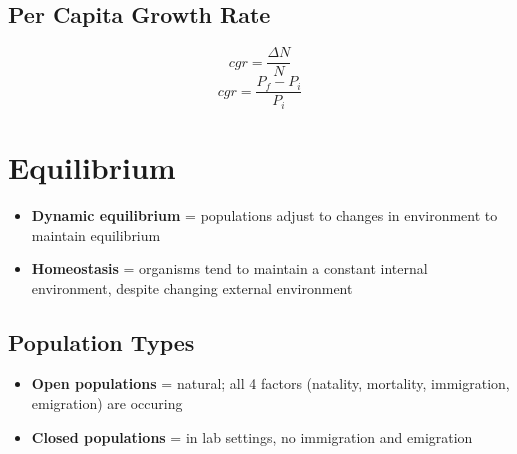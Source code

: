 \documentclass[a4paper,12pt]{article}
\begin{document}
\subsection{Per Capita Growth Rate}
\Huge 
$$cgr = \frac{\Delta{N}}{N}$$
\normalsize
$$cgr = \frac{P_f - P_i}{P_i}$$

\section{Equilibrium}
\begin{itemize}
    \item{\textbf{Dynamic equilibrium} = populations adjust to changes in environment to maintain equilibrium}
    \item{\textbf{Homeostasis} = organisms tend to maintain a constant internal environment, despite changing external environment}
\end{itemize}

\subsection{Population Types}
\begin{itemize}
    \item{\textbf{Open populations} = natural; all 4 factors (natality, mortality, immigration, emigration) are occuring}
    \item{\textbf{Closed populations} = in lab settings, no immigration and emigration}
\end{itemize}
\end{document}
